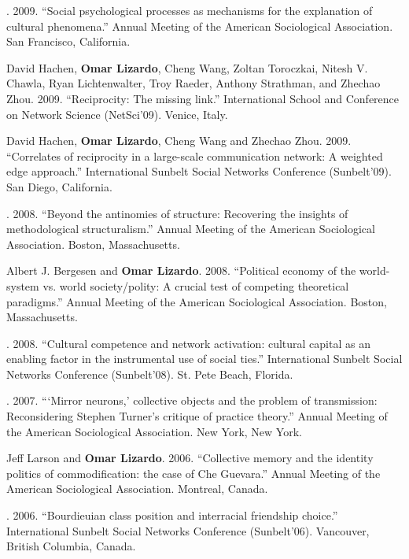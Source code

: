 . 2009.  ``Social psychological processes as mechanisms for the explanation of cultural phenomena.'' Annual Meeting of the American Sociological Association. San Francisco, California.   

\ind David Hachen, {\bf Omar Lizardo}, Cheng Wang, Zoltan Toroczkai, Nitesh V. Chawla, Ryan Lichtenwalter, Troy Raeder, Anthony Strathman, and Zhechao Zhou.  2009. ``Reciprocity: The missing link.'' International School and Conference on Network Science (NetSci'09). Venice, Italy.

\ind David Hachen, {\bf Omar Lizardo}, Cheng Wang and Zhechao Zhou.  2009. ``Correlates of reciprocity in a large-scale communication network: A weighted edge approach.'' International Sunbelt Social Networks Conference (Sunbelt'09). San Diego, California. 

. 2008. ``Beyond the antinomies of structure: Recovering the insights of methodological structuralism.'' Annual Meeting of the American Sociological Association. Boston, Massachusetts.

\ind Albert J. Bergesen and {\bf Omar Lizardo}.  2008. ``Political economy of the world-system vs. world society/polity:  A crucial test of competing theoretical paradigms.'' Annual Meeting of the American Sociological Association. Boston, Massachusetts.   

. 2008. ``Cultural competence and network activation:  cultural capital as an enabling factor in the instrumental use of social ties.'' International Sunbelt Social Networks Conference (Sunbelt'08). St. Pete Beach, Florida.

. 2007.  ```Mirror neurons,' collective objects and the problem of transmission: Reconsidering Stephen Turner's critique of practice theory.'' Annual Meeting of the American Sociological Association. New York, New York.

\ind Jeff Larson and {\bf Omar Lizardo}. 2006. ``Collective memory and the identity politics of commodification: the case of Che Guevara.''  Annual Meeting of the American Sociological Association. Montreal, Canada.  

. 2006. ``Bourdieuian class position and interracial friendship choice.'' International Sunbelt Social Networks Conference (Sunbelt'06). Vancouver, British Columbia, Canada.  

